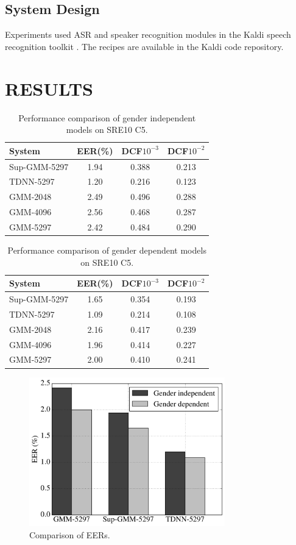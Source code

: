 \documentclass{article}
\begin{document}
\subsection{System Design}
Experiments used ASR and speaker recognition modules in the
Kaldi speech recognition toolkit \cite{kaldi}. The recipes are
available in the Kaldi code repository.

\section{RESULTS}
\begin{table}
\begin{center}
\begin{tabular}{l|ccc}
\hline
System & EER(\%) & DCF$10^{-3}$ & DCF$10^{-2}$ \\ \hline \hline
Sup-GMM-5297 & 1.94 & 0.388 & 0.213 \\
TDNN-5297 & 1.20 & 0.216 & 0.123 \\
GMM-2048 & 2.49 & 0.496 & 0.288 \\
GMM-4096 & 2.56 & 0.468 & 0.287 \\
GMM-5297 & 2.42 & 0.484 & 0.290 \\ \hline
\end{tabular}
\end{center}
\caption{Performance comparison of gender independent models on SRE10 C5.}
\label{gender_ind}
\end{table}

\begin{table}
\begin{center}
\begin{tabular}{l|ccc}
\hline
System & EER(\%) & DCF$10^{-3}$ & DCF$10^{-2}$ \\ \hline \hline
Sup-GMM-5297 & 1.65 & 0.354 & 0.193 \\
TDNN-5297 & 1.09 & 0.214 & 0.108 \\
GMM-2048 & 2.16 & 0.417 & 0.239 \\
GMM-4096 & 1.96 & 0.414 & 0.227 \\
GMM-5297 & 2.00 & 0.410 & 0.241 \\ \hline
\end{tabular}
\end{center}
\caption{Performance comparison of gender dependent models on SRE10 C5.}
\label{gender_dep}
\end{table}

\begin{figure}[t]
\centerline{\includegraphics[width=8.5cm]{fig/eer}}
\caption{Comparison of EERs.}
\label{fig:eer}
\end{figure}
\end{document}
